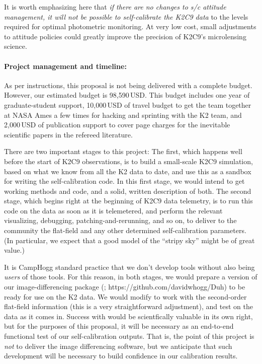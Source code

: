 \documentclass[12pt,preprint]{aastex}
\begin{document}
It is worth emphasizing here that \emph{if there are no changes to s/c
  attitude management, it will not be possible to self-calibrate the
  K2C9 data} to the levels required for optimal photometric monitoring.
At very low cost, small adjustments to attitude policies could greatly
improve the precision of K2C9's microlensing science.

\paragraph{Project management and timeline:}

As per instructions, this proposal is not being delivered with a complete
budget.
However, our estimated budget is 98,590\,USD.
This budget includes one year of graduate-student support,
10,000\,USD of travel budget to get the team together at NASA Ames a
few times for hacking and sprinting with the K2 team,
and 2,000\,USD of publication support to cover page charges for
the inevitable scientific papers in the refereed literature.

There are two important stages to this project:
The first, which happens well before the start of K2C9 observations,
is to build a small-scale K2C9 simulation, based on what we know from
all the K2 data to date, and use this as a sandbox for writing the
self-calibration code.
In this first stage, we would intend to get working methods and code,
and a solid, written description of both.
The second stage, which begins right at the beginning of K2C9 data
telemetry, is to run this code on the data as soon as it is
telemetered, and perform the relevant visualizing, debugging,
patching-and-rerunning, and so on, to deliver to the community the
flat-field and any other determined self-calibration parameters.
(In particular, we expect that a good model of the ``stripy sky''
might be of great value.)

It is CampHogg standard practice that we don't develop tools without
also being \emph{users} of those tools.
For this reason, in both stages, we would prepare a version of our
image-differencing package (; https://github.com/davidwhogg/Duh)
to be ready for use on the K2 data.
We would modify  to work with the second-order flat-field
information (this is a very straightforward adjustment), and test
 on the data as it comes in.
Success with  would be scientfically valuable in its own
right, but for the purposes of this proposal, it will be necessary as
an end-to-end functional test of our self-calibration outputs.
That is, the point of this project is \emph{not} to deliver the image
differencing software, but we anticipate that such development will be
necessary to build confidence in our calibration results.
\end{document}
